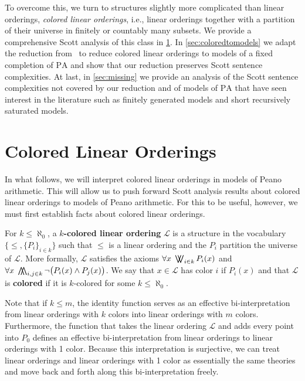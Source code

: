\documentclass[11pt]{amsart}
\newcommand{\mc}[1]{\mathcal{#1}}
\newcommand{\PA}{\mathrm{PA}}
\newcommand{\bigwwedge}{%
	\mathop{
		\mathchoice{\bigwedge\mkern-15mu\bigwedge}
		{\bigwedge\mkern-12.5mu\bigwedge}
		{\bigwedge\mkern-12.5mu\bigwedge}
		{\bigwedge\mkern-11mu\bigwedge}
	}
}
\newcommand{\bigvvee}{%
	\mathop{
		\mathchoice{\bigvee\mkern-15mu\bigvee}
		{\bigvee\mkern-12.5mu\bigvee}
		{\bigvee\mkern-12.5mu\bigvee}
		{\bigvee\mkern-11mu\bigvee}
	}
}
\theoremstyle{remark}
\newcommand{\define}[1]{\textbf{#1}}
\begin{document}
To overcome this, we turn to structures slightly more complicated than linear orderings, \emph{colored linear orderings}, i.e., linear orderings together with a partition of their universe in finitely or countably many subsets. We provide a comprehensive Scott analysis of this class in \cref{sec:coloredlo}. In \cref{sec:coloredtomodels} we adapt the reduction from~\cite{MR23} to reduce colored linear orderings to models of a fixed completion of $\PA$ and show that our reduction preserves Scott sentence complexities. At last, in \cref{sec:missing} we provide an analysis of the Scott sentence complexities not covered by our reduction and of models of $\PA$ that have seen interest in the literature such as finitely generated models and short recursively saturated models.

\section{Colored Linear Orderings}\label{sec:coloredlo}
In what follows, we will interpret colored linear orderings in models of Peano arithmetic.
This will allow us to push forward Scott analysis results about colored linear orderings to models of Peano arithmetic.
For this to be useful, however, we must first establish facts about colored linear orderings. 

For $k\leq \aleph_0$, a \define{$k$-colored linear ordering} $\mc{L}$ is a structure in the vocabulary $\{\leq,\{P_i\}_{i\in k}\}$ such that $\leq$ is a linear ordering and the $P_i$ partition the universe of $\mc{L}$. More formally, $\mc{L}$ satisfies the axioms $\forall x\;\bigvvee_{i\in k} P_i(x)$ and $\forall x \; \bigwwedge_{i,j\in k} \lnot \big( P_i(x) \land P_j(x) \big)$.
We say that $x\in \mc L$ has color $i$ if $P_i(x)$ and that $\mc L$ is \define{colored} if it is $k$-colored for some $k\leq \aleph_0$.

Note that if $k\leq m$, the identity function serves as an effective bi-interpretation from linear orderings with $k$ colors into linear orderings with $m$ colors. 
Furthermore, the function that takes the linear ordering $\mc{L}$ and adds every point into $P_0$ defines an effective bi-interpretation from linear orderings to linear orderings with 1 color.
Because this interpretation is surjective, we can treat linear orderings and linear orderings with 1 color as essentially the same theories and move back and forth along this bi-interpretation freely. 
\end{document}
